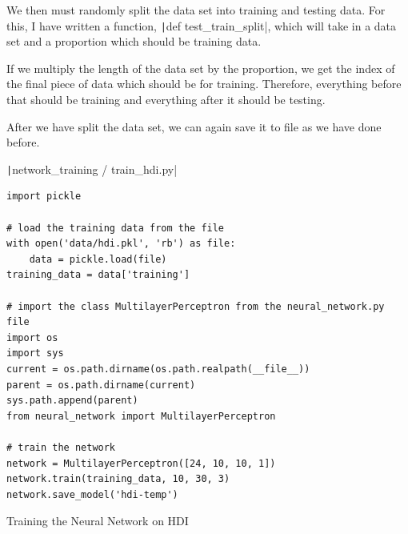 \documentclass[12pt]{report}
\newcommand{\pil}[1]{\protect\texttt|#1|}
\begin{document}
We then must randomly split the data set into training and testing data. For this, I have written a function, \pil{def test_train_split}, which will take in a data set and a proportion which should be training data.

If we multiply the length of the data set by the proportion, we get the index of the final piece of data which should be for training. Therefore, everything before that should be training and everything after it should be testing.

After we have split the data set, we can again save it to file as we have done before.

\begin{center}
\end{center}

\begin{listing}[H]
\pil{network_training / train_hdi.py}
\begin{verbatim}
import pickle

# load the training data from the file
with open('data/hdi.pkl', 'rb') as file:
    data = pickle.load(file)
training_data = data['training']

# import the class MultilayerPerceptron from the neural_network.py file
import os
import sys
current = os.path.dirname(os.path.realpath(__file__))
parent = os.path.dirname(current)
sys.path.append(parent)
from neural_network import MultilayerPerceptron

# train the network
network = MultilayerPerceptron([24, 10, 10, 1])
network.train(training_data, 10, 30, 3)
network.save_model('hdi-temp')
\end{verbatim}
\caption{Training the Neural Network on HDI}\label{cs:trainHDI}
\end{listing}
\end{document}
